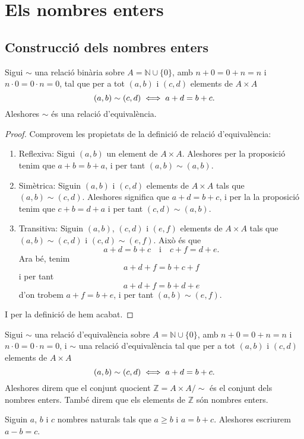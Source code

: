 \documentclass[../Apunts.tex]{subfiles}
\begin{document}
	\section{Els nombres enters}
	\subsection{Construcció dels nombres enters}
	\begin{proposition}
		Sigui \(\sim\) una relació binària sobre \(A=\mathbb{N}\cup\{0\}\), amb \(n+0=0+n=n\) i \(n\cdot 0=0\cdot n=0\), tal que per a tot \((a,b)\) i \((c,d)\) elements de \(A\times A\)
		\[(a,b)\sim(c,d)\iff a+d=b+c.\]
		Aleshores \(\sim\) és una relació d'equivalència.
		\begin{proof}
			Comprovem les propietats de la definició de relació d'equivalència:
			\begin{enumerate}
				\item Reflexiva: Sigui \((a,b)\) un element de \(A\times A\). Aleshores per la proposició  tenim que \(a+b=b+a\), i per tant \((a,b)\sim(a,b)\).
				\item Simètrica: Siguin \((a,b)\) i \((c,d)\) elements de \(A\times A\) tals que \((a,b)\sim(c,d)\). Aleshores significa que \(a+d=b+c\), i per la la proposició  tenim que \(c+b=d+a\) i per tant \((c,d)\sim(a,b)\).
				\item Transitiva: Siguin \((a,b)\), \((c,d)\) i \((e,f)\) elements de \(A\times A\) tals que \((a,b)\sim(c,d)\) i \((c,d)\sim(e,f)\). Això és que
				\[a+d=b+c\quad\text{i}\quad c+f=d+e.\]
				Ara bé, tenim
				\[a+d+f=b+c+f\]
				i per tant
				\[a+d+f=b+d+e\]
				d'on trobem \(a+f=b+e\), i per tant \((a,b)\sim(e,f)\).
			\end{enumerate}
			I per la definició de  hem acabat.
		\end{proof}
	\end{proposition}
	\begin{definition}
		\label{def:nombres enters}
		Sigui \(\sim\) una relació d'equivalència sobre \(A=\mathbb{N}\cup\{0\}\), amb \(n+0=0+n=n\) i \(n\cdot 0=0\cdot n=0\), i \(\sim\) una relació d'equivalència tal que per a tot \((a,b)\) i \((c,d)\) elements de \(A\times A\)
		\[(a,b)\sim(c,d)\iff a+d=b+c.\]
		Aleshores direm que el conjunt quocient \(\mathbb{Z}=A\times A/\sim\) és el conjunt dels nombres enters. També direm que els elements de \(\mathbb{Z}\) són nombres enters.
	\end{definition}
	\begin{definition}
		\label{def:resta de nombres naturals}
		Siguin \(a\), \(b\) i \(c\) nombres naturals tals que \(a\geq b\) i \(a=b+c\). Aleshores escriurem \(a-b=c\).
	\end{definition}
\end{document}
